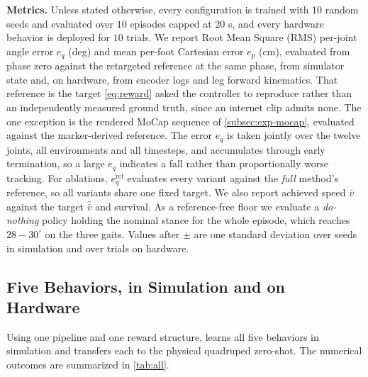 \documentclass[letterpaper, 10 pt, conference]{ieeeconf}
\begin{document}
\textbf{Metrics.} Unless stated otherwise, every configuration is trained with $10$ random seeds and evaluated over $10$ episodes capped at $20$ s, and every hardware behavior is deployed for $10$ trials. We report Root Mean Square (RMS) per-joint angle error $e_q$ (deg) and mean per-foot Cartesian error $e_p$ (cm), evaluated from phase zero against the retargeted reference at the same phase, from simulator state and, on hardware, from encoder logs and leg forward kinematics. That reference is the target \autoref{eq:reward} asked the controller to reproduce rather than an independently measured ground truth, since an internet clip admits none. The one exception is the rendered MoCap sequence of \autoref{subsec:exp-mocap}, evaluated against the marker-derived reference. The error $e_q$ is taken jointly over the twelve joints, all environments and all timesteps, and accumulates through early termination, so a large $e_q$ indicates a fall rather than proportionally worse tracking. For ablations, $e_q^{\mathrm{ref}}$ evaluates every variant against the \textit{full} method's reference, so all variants share one fixed target. We also report achieved speed $\bar v$ against the target $\hat{\bar v}$ and survival. As a reference-free floor we evaluate a \textit{do-nothing} policy holding the nominal stance for the whole episode, which reaches $28-30^\circ$ on the three gaits. Values after $\pm$ are one standard deviation over seeds in simulation and over trials on hardware.





\subsection{Five Behaviors, in Simulation and on Hardware}\label{subsec:exp-sim}
\noindent
Using one pipeline and one reward structure, \ourMethod learns all five behaviors in simulation and transfers each to the physical quadruped zero-shot. The numerical outcomes are summarized in \autoref{tab:all}.
\end{document}
